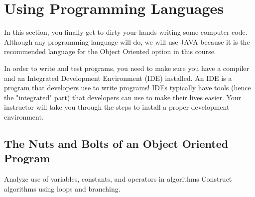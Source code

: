 \section{Using Programming Languages}
In this section, you finally get to dirty your hands writing some computer code. Although any programming language will do, we will use JAVA because it is the recommended language for the Object Oriented option in this course.

In order to write and test programs, you need to make sure you have a compiler and an Integrated Development Environment (IDE) installed. An IDE is a program that developers use to write programs! IDEs typically have tools (hence the "integrated" part) that developers can use to make their lives easier. Your instructor will take you through the steps to install a proper development environment.

\subsection{The Nuts and Bolts of an Object Oriented Program}

Analyze use of variables, constants, and operators in algorithms
Construct algorithms using loops and branching.

